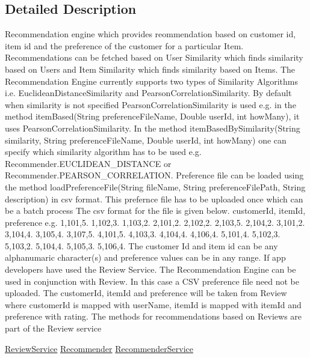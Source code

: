 \subsection{Detailed Description}
Recommendation engine which provides reommendation based on customer id, item id and the preference of the customer for a particular Item. Recommendations can be fetched based on User Similarity which finds similarity based on Users and Item Similarity which finds similarity based on Items. The Recommendation Engine currently supports two types of Similarity Algorithms i.\+e. Euclidean\+Distance\+Similarity and Pearson\+Correlation\+Similarity. By default when similarity is not specified Pearson\+Correlation\+Similarity is used e.\+g. in the method item\+Based(\+String preference\+File\+Name, Double   user\+Id, int  how\+Many), it uses Pearson\+Correlation\+Similarity. In the method item\+Based\+By\+Similarity(\+String similarity, String preference\+File\+Name, Double   user\+Id, int  how\+Many) one can specify which similarity algorithm has to be used e.\+g. Recommender.\+E\+U\+C\+L\+I\+D\+E\+A\+N\+\_\+\+D\+I\+S\+T\+A\+N\+C\+E or Recommender.\+P\+E\+A\+R\+S\+O\+N\+\_\+\+C\+O\+R\+R\+E\+L\+A\+T\+I\+O\+N. Preference file can be loaded using the method load\+Preference\+File(\+String file\+Name, String preference\+File\+Path, String description) in csv format. This prefernce file has to be uploaded once which can be a batch process The csv format for the file is given below. customer\+Id, item\+Id, preference e.\+g. 1,101,5. 1,102,3. 1,103,2. 2,101,2. 2,102,2. 2,103,5. 2,104,2. 3,101,2. 3,104,4. 3,105,4. 3,107,5. 4,101,5. 4,103,3. 4,104,4. 4,106,4. 5,101,4. 5,102,3. 5,103,2. 5,104,4. 5,105,3. 5,106,4. The customer Id and item id can be any alphanumaric character(s) and preference values can be in any range. If app developers have used the Review Service. The Recommendation Engine can be used in conjunction with Review. In this case a C\+S\+V preference file need not be uploaded. The customer\+Id, item\+Id and preference will be taken from Review where customer\+Id is mapped with user\+Name, item\+Id is mapped with item\+Id and preference with rating. The methods for recommendations based on Reviews are part of the Review service 

\hyperlink{classcom_1_1shephertz_1_1app42_1_1paas_1_1sdk_1_1csharp_1_1recommend_1_1_recommender_service}{Review\+Service} \hyperlink{classcom_1_1shephertz_1_1app42_1_1paas_1_1sdk_1_1csharp_1_1recommend_1_1_recommender_service}{Recommender} \hyperlink{classcom_1_1shephertz_1_1app42_1_1paas_1_1sdk_1_1csharp_1_1recommend_1_1_recommender_service}{Recommender\+Service} 

